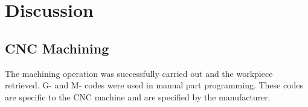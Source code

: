 \section{Discussion}
\subsection{CNC Machining}
The machining operation was successfully carried out and the workpiece retrieved. G- and M- codes were used in manual part programming. These codes are specific to the CNC machine and are specified by the manufacturer.\\